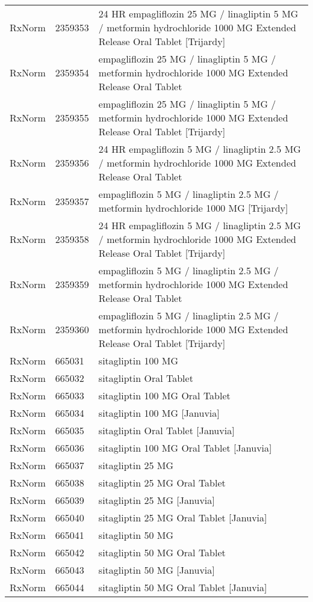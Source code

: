 \begin{longtable}{p{}p{}p{}}
  RxNorm & 2359353 & 24 HR empagliflozin 25 MG / linagliptin 5 MG / metformin hydrochloride 1000 MG Extended Release Oral Tablet [Trijardy] \\ 
  RxNorm & 2359354 & empagliflozin 25 MG / linagliptin 5 MG / metformin hydrochloride 1000 MG Extended Release Oral Tablet \\ 
  RxNorm & 2359355 & empagliflozin 25 MG / linagliptin 5 MG / metformin hydrochloride 1000 MG Extended Release Oral Tablet [Trijardy] \\ 
  RxNorm & 2359356 & 24 HR empagliflozin 5 MG / linagliptin 2.5 MG / metformin hydrochloride 1000 MG Extended Release Oral Tablet \\ 
  RxNorm & 2359357 & empagliflozin 5 MG / linagliptin 2.5 MG / metformin hydrochloride 1000 MG [Trijardy] \\ 
  RxNorm & 2359358 & 24 HR empagliflozin 5 MG / linagliptin 2.5 MG / metformin hydrochloride 1000 MG Extended Release Oral Tablet [Trijardy] \\ 
  RxNorm & 2359359 & empagliflozin 5 MG / linagliptin 2.5 MG / metformin hydrochloride 1000 MG Extended Release Oral Tablet \\ 
  RxNorm & 2359360 & empagliflozin 5 MG / linagliptin 2.5 MG / metformin hydrochloride 1000 MG Extended Release Oral Tablet [Trijardy] \\ 
  RxNorm & 665031 & sitagliptin 100 MG \\ 
  RxNorm & 665032 & sitagliptin Oral Tablet \\ 
  RxNorm & 665033 & sitagliptin 100 MG Oral Tablet \\ 
  RxNorm & 665034 & sitagliptin 100 MG [Januvia] \\ 
  RxNorm & 665035 & sitagliptin Oral Tablet [Januvia] \\ 
  RxNorm & 665036 & sitagliptin 100 MG Oral Tablet [Januvia] \\ 
  RxNorm & 665037 & sitagliptin 25 MG \\ 
  RxNorm & 665038 & sitagliptin 25 MG Oral Tablet \\ 
  RxNorm & 665039 & sitagliptin 25 MG [Januvia] \\ 
  RxNorm & 665040 & sitagliptin 25 MG Oral Tablet [Januvia] \\ 
  RxNorm & 665041 & sitagliptin 50 MG \\ 
  RxNorm & 665042 & sitagliptin 50 MG Oral Tablet \\ 
  RxNorm & 665043 & sitagliptin 50 MG [Januvia] \\ 
  RxNorm & 665044 & sitagliptin 50 MG Oral Tablet [Januvia] \\ 

\end{longtable}
